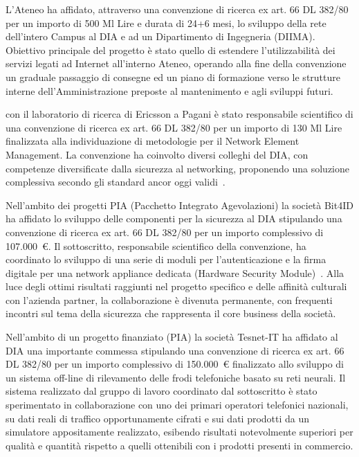 \documentclass[11pt,a4paper,sans]{moderncv}        %
\begin{document}
{
L'Ateneo ha affidato, attraverso una convenzione di ricerca ex art. 66 DL 382/80 per un importo di 500 Ml Lire e durata di 24+6 mesi, lo sviluppo della rete dell'intero Campus al DIA e ad un Dipartimento di Ingegneria (DIIMA). Obiettivo principale del progetto è stato quello di estendere l'utilizzabilità dei servizi legati ad Internet all’interno Ateneo, operando alla fine della convenzione un graduale passaggio di consegne ed un piano di formazione verso le strutture interne dell'Amministrazione preposte al mantenimento e agli sviluppi futuri.
}

{
con il laboratorio di ricerca di Ericsson a Pagani è stato responsabile scientifico di una convenzione di ricerca ex art. 66 DL 382/80 per un importo di 130 Ml Lire finalizzata alla individuazione di metodologie per il Network Element Management. La convenzione ha coinvolto diversi colleghi del DIA, con competenze diversificate dalla sicurezza al networking, proponendo una soluzione complessiva secondo gli standard ancor oggi validi~\cite{wbem:03,Cattaneo2003975}.
}

{
Nell'ambito dei progetti PIA (Pacchetto Integrato Agevolazioni) la società Bit4ID ha affidato lo sviluppo delle componenti per la sicurezza al DIA stipulando una convenzione di ricerca ex art. 66 DL 382/80 per un importo complessivo di 107.000~\euro{}. Il sottoscritto, responsabile scientifico della convenzione, ha coordinato lo sviluppo di una serie di moduli per l’autenticazione e la firma digitale per una network appliance dedicata (Hardware Security Module)~\cite{Cattaneo200798,Cattaneo2010213,HSMProxyChap:2012}. Alla luce degli ottimi risultati raggiunti nel progetto specifico e delle affinità culturali con l'azienda partner, la collaborazione è divenuta permanente, con frequenti incontri sul tema della sicurezza che rappresenta il core business della società.
}

{
Nell'ambito di un progetto finanziato (PIA) la società Tesnet-IT ha affidato al DIA una importante commessa stipulando una convenzione di ricerca ex art. 66 DL 382/80 per un importo complessivo di 150.000~\euro{} finalizzato allo sviluppo di un sistema off-line di rilevamento delle frodi telefoniche basato su reti neurali. Il sistema realizzato dal gruppo di lavoro coordinato dal sottoscritto è stato sperimentato in collaborazione con uno dei primari operatori telefonici nazionali, su dati reali di traffico opportunamente cifrati e sui dati prodotti da un simulatore appositamente realizzato, esibendo risultati notevolmente superiori per qualità e quantità rispetto a quelli ottenibili con i prodotti presenti in commercio.
}
\end{document}
